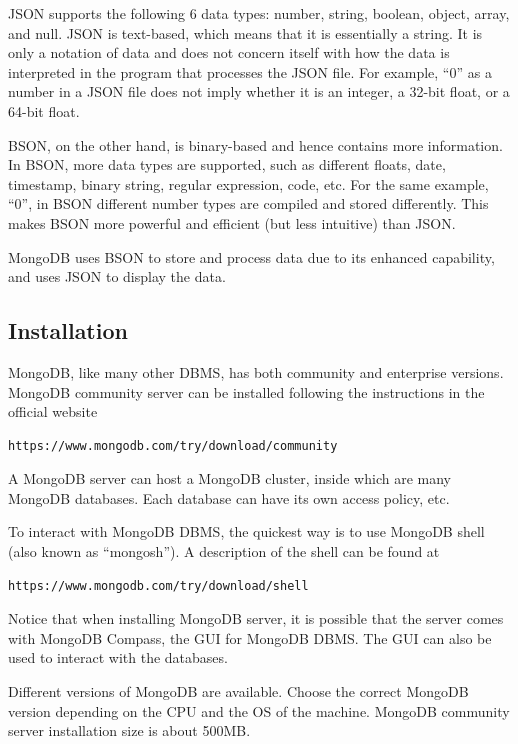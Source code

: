 \begin{shortbox}
	
	JSON supports the following 6 data types: number, string, boolean, object, array, and null. JSON is text-based, which means that it is essentially a string. It is only a notation of data and does not concern itself with how the data is interpreted in the program that processes the JSON file. For example, ``0'' as a number in a JSON file does not imply whether it is an integer, a 32-bit float, or a 64-bit float.
	
	BSON, on the other hand, is binary-based and hence contains more information. In BSON, more data types are supported, such as different floats, date, timestamp, binary string, regular expression, code, etc. For the same example, ``0'', in BSON different number types are compiled and stored differently. This makes BSON more powerful and efficient (but less intuitive) than JSON.
	
\end{shortbox}

MongoDB uses BSON to store and process data due to its enhanced capability, and uses JSON to display the data.

\subsection{Installation}

MongoDB, like many other DBMS, has both community and enterprise versions. MongoDB community server can be installed following the instructions in the official website
\begin{lstlisting}
https://www.mongodb.com/try/download/community
\end{lstlisting}
A MongoDB server can host a MongoDB cluster, inside which are many MongoDB databases. Each database can have its own access policy, etc.

To interact with MongoDB DBMS, the quickest way is to use MongoDB shell (also known as ``mongosh''). A description of the shell can be found at
\begin{lstlisting}
https://www.mongodb.com/try/download/shell
\end{lstlisting}
Notice that when installing MongoDB server, it is possible that the server comes with MongoDB Compass, the GUI for MongoDB DBMS. The GUI can also be used to interact with the databases.

Different versions of MongoDB are available. Choose the correct MongoDB version depending on the CPU and the OS of the machine. MongoDB community server installation size is about 500MB.

